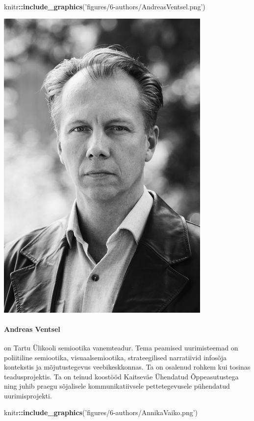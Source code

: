 \documentclass[estonian,]{article}
\newenvironment{Shaded}{\begin{snugshade}}{\end{snugshade}}
\newcommand{\KeywordTok}[1]{\textcolor[rgb]{0.13,0.29,0.53}{\textbf{#1}}}
\newcommand{\NormalTok}[1]{#1}
\newcommand{\OperatorTok}[1]{\textcolor[rgb]{0.81,0.36,0.00}{\textbf{#1}}}
\newcommand{\StringTok}[1]{\textcolor[rgb]{0.31,0.60,0.02}{#1}}
\let\oldparagraph\paragraph
\renewcommand{\paragraph}[1]{\oldparagraph{#1}\mbox{}}
\begin{document}
\begin{Shaded}
\begin{Highlighting}[]
\NormalTok{knitr}\OperatorTok{::}\KeywordTok{include_graphics}\NormalTok{(}\StringTok{'figures/6-authors/AndreasVentsel.png'}\NormalTok{)}
\end{Highlighting}
\end{Shaded}

\begin{flushleft}\includegraphics[width=0.5\linewidth]{figures/6-authors/AndreasVentsel} \end{flushleft}

\hypertarget{andreas-ventsel}{%
\paragraph{Andreas Ventsel}\label{andreas-ventsel}}

on Tartu Ülikooli semiootika vanemteadur. Tema peamised uurimisteemad on poliitiline semiootika, visuaalsemiootika, strateegilised narratiivid infosõja kontekstis ja mõjutustegevus veebikeskkonnas. Ta on osalenud rohkem kui tosinas teadusprojektis. Ta on teinud koostööd Kaitseväe Ühendatud Õppeasutustega ning juhib praegu sõjalisele kommunikatiivsele pettetegevusele pühendatud uurimisprojekti.

\begin{Shaded}
\begin{Highlighting}[]
\NormalTok{knitr}\OperatorTok{::}\KeywordTok{include_graphics}\NormalTok{(}\StringTok{'figures/6-authors/AnnikaVaiko.png'}\NormalTok{)}
\end{Highlighting}
\end{Shaded}
\end{document}
